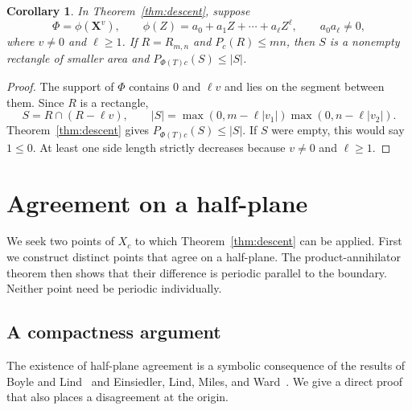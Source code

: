 \documentclass[11pt,a4paper,reqno]{amsart}
\newtheorem{corollary}[theorem]{Corollary}
\theoremstyle{remark}
\newcommand{\mon}[1]{\boldsymbol X^{#1}}
\numberwithin{equation}{section}
\begin{document}
\begin{corollary}\label{cor:line-descent}
In Theorem~\ref{thm:descent}, suppose
\[
 \Phi=\phi(\mon v),\qquad
 \phi(Z)=a_0+a_1Z+\cdots+a_\ell Z^\ell,
 \qquad a_0a_\ell\ne0,
\]
where $v\ne0$ and $\ell\ge1$. If $R=R_{m,n}$ and $P_c(R)\le mn$, then $S$ is a nonempty rectangle of smaller area and $P_{\Phi(T)c}(S)\le|S|$.
\end{corollary}
\begin{proof}
The support of $\Phi$ contains $0$ and $\ell v$ and lies on the segment between them. Since $R$ is a rectangle,
\[
 S=R\cap(R-\ell v),\qquad
 |S|=\max(0,m-\ell|v_1|)\max(0,n-\ell|v_2|).
\]
Theorem~\ref{thm:descent} gives $P_{\Phi(T)c}(S)\le|S|$. If $S$ were empty, this would say $1\le0$. At least one side length strictly decreases because $v\ne0$ and $\ell\ge1$.
\end{proof}

\section{Agreement on a half-plane}\label{sec:halfplane}
We seek two points of $X_c$ to which Theorem~\ref{thm:descent} can be applied. First we construct distinct points that agree on a half-plane. The product-annihilator theorem then shows that their difference is periodic parallel to the boundary. Neither point need be periodic individually.

\subsection{A compactness argument}
The existence of half-plane agreement is a symbolic consequence of the results of Boyle and Lind~\cite[Theorem~3.7]{BL} and Einsiedler, Lind, Miles, and Ward~\cite[Lemma~2.9]{ELMW}. We give a direct proof that also places a disagreement at the origin.
\end{document}
